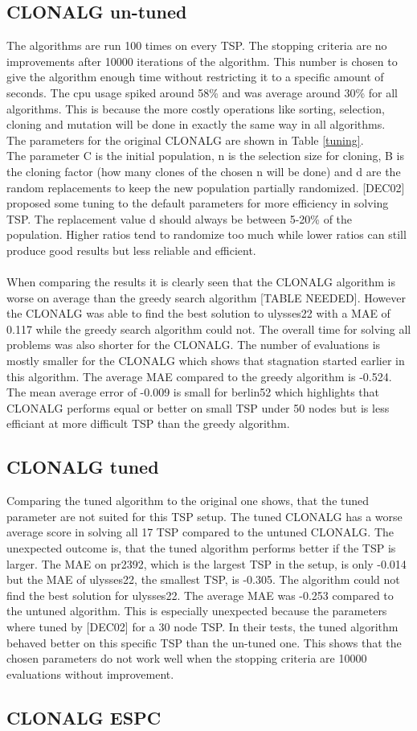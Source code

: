 \subsection{CLONALG un-tuned}
The algorithms are run 100 times on every TSP. The stopping criteria are no improvements after 10000 iterations of the algorithm. This number is chosen to give the algorithm enough time without restricting it to a specific amount of seconds. The cpu usage spiked around 58\% and was average around 30\% for all algorithms. This is because the more costly operations like sorting, selection, cloning and mutation will be done in exactly the same way in all algorithms.\\
The parameters for the original CLONALG are shown in Table \ref{tuning}.\\
The parameter C is the initial population, n is the selection size for cloning, B is the cloning factor (how many clones of the chosen n will be done) and d are the random replacements to keep the new population partially randomized. [DEC02] proposed some tuning to the default parameters for more efficiency in solving TSP. The replacement value d should always be between 5-20\% of the population. Higher ratios tend to randomize too much while lower ratios can still produce good results but less reliable and efficient.\\\\
When comparing the results it is clearly seen that the CLONALG algorithm is worse on average than the greedy search algorithm [TABLE NEEDED]. However the CLONALG was able to find the best solution to ulysses22 with a MAE of 0.117 while the greedy search algorithm could not. The overall time for solving all problems was also shorter for the CLONALG. The number of evaluations is mostly smaller for the CLONALG which shows that stagnation started earlier in this algorithm. The average MAE compared to the greedy algorithm is -0.524. The mean average error of -0.009 is small for berlin52 which highlights that CLONALG performs equal or better on small TSP under 50 nodes but is less efficiant at more difficult TSP than the greedy algorithm.
\subsection{CLONALG tuned}
Comparing the tuned algorithm to the original one shows, that the tuned parameter are not suited for this TSP setup. The tuned CLONALG has a worse average score in solving all 17 TSP compared to the untuned CLONALG. The unexpected outcome is, that the tuned algorithm performs better if the TSP is larger. The MAE on pr2392, which is the largest TSP in the setup, is only -0.014 but the MAE of ulysses22, the smallest TSP, is -0.305. The algorithm could not find the best solution for ulysses22. The average MAE was -0.253 compared to the untuned algorithm. This is especially unexpected because the parameters where tuned by [DEC02] for a 30 node TSP. In their tests, the tuned algorithm behaved better on this specific TSP than the un-tuned one. This shows that the chosen parameters do not work well when the stopping criteria are 10000 evaluations without improvement.
\subsection{CLONALG ESPC}
